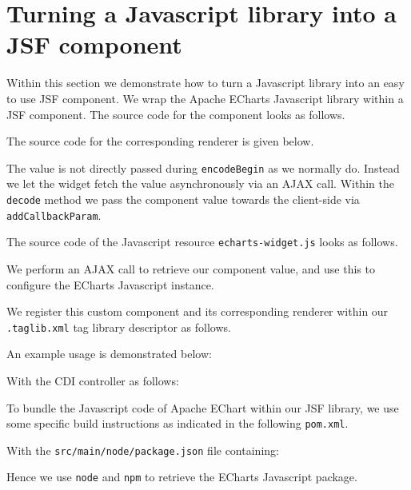 \section{Turning a Javascript library into a JSF component}
Within this section we demonstrate how to turn a Javascript library into an easy to use JSF component.
We wrap the Apache ECharts \cite{ECharts} Javascript library within a JSF component.
The source code for the component looks as follows.


The source code for the corresponding renderer is given below.

The value is not directly passed during \texttt{encodeBegin} as we normally do.
Instead we let the widget fetch the value asynchronously via an AJAX call.
Within the \texttt{decode} method we pass the component value towards the client-side via \texttt{addCallbackParam}.

The source code of the Javascript resource \texttt{echarts-widget.js} looks as follows.

We perform an AJAX call to retrieve our component value, and use this to configure the ECharts Javascript instance.

We register this custom component and its corresponding renderer within our \texttt{.taglib.xml} tag library descriptor as follows.


An example usage is demonstrated below:


With the CDI controller as follows:


To bundle the Javascript code of Apache EChart within our JSF library, we use some specific build instructions as indicated in the following \texttt{pom.xml}.

With the \texttt{src/main/node/package.json} file containing:

Hence we use \texttt{node} and \texttt{npm} to retrieve the ECharts Javascript package.

